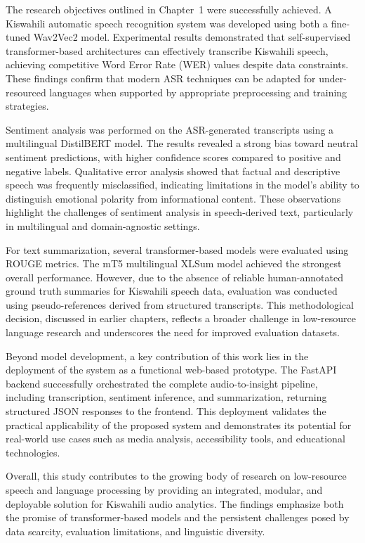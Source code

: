 The research objectives outlined in Chapter~1 were successfully achieved. A Kiswahili automatic speech recognition system was developed using both a fine-tuned Wav2Vec2 model. Experimental results demonstrated that self-supervised transformer-based architectures can effectively transcribe Kiswahili speech, achieving competitive Word Error Rate (WER) values despite data constraints. These findings confirm that modern ASR techniques can be adapted for under-resourced languages when supported by appropriate preprocessing and training strategies.

Sentiment analysis was performed on the ASR-generated transcripts using a multilingual DistilBERT model. The results revealed a strong bias toward neutral sentiment predictions, with higher confidence scores compared to positive and negative labels. Qualitative error analysis showed that factual and descriptive speech was frequently misclassified, indicating limitations in the model’s ability to distinguish emotional polarity from informational content. These observations highlight the challenges of sentiment analysis in speech-derived text, particularly in multilingual and domain-agnostic settings.

For text summarization, several transformer-based models were evaluated using ROUGE metrics. The mT5 multilingual XLSum model achieved the strongest overall performance. However, due to the absence of reliable human-annotated ground truth summaries for Kiswahili speech data, evaluation was conducted using pseudo-references derived from structured transcripts. This methodological decision, discussed in earlier chapters, reflects a broader challenge in low-resource language research and underscores the need for improved evaluation datasets.

Beyond model development, a key contribution of this work lies in the deployment of the system as a functional web-based prototype. The FastAPI backend successfully orchestrated the complete audio-to-insight pipeline, including transcription, sentiment inference, and summarization, returning structured JSON responses to the frontend. This deployment validates the practical applicability of the proposed system and demonstrates its potential for real-world use cases such as media analysis, accessibility tools, and educational technologies.

Overall, this study contributes to the growing body of research on low-resource speech and language processing by providing an integrated, modular, and deployable solution for Kiswahili audio analytics. The findings emphasize both the promise of transformer-based models and the persistent challenges posed by data scarcity, evaluation limitations, and linguistic diversity.

